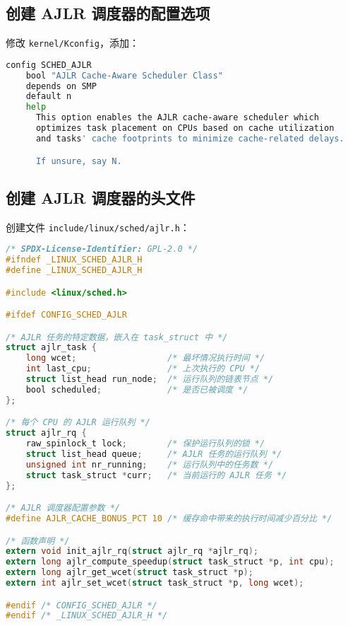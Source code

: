 \documentclass[a4paper,12pt]{article}
\begin{document}
\subsection{创建 AJLR 调度器的配置选项}

修改 \texttt{kernel/Kconfig}，添加：

\begin{lstlisting}[language=bash]
config SCHED_AJLR
    bool "AJLR Cache-Aware Scheduler Class"
    depends on SMP
    default n
    help
      This option enables the AJLR cache-aware scheduler which
      optimizes task placement on CPUs based on cache utilization
      and tasks' cache footprints to minimize cache-related delays.

      If unsure, say N.
\end{lstlisting}

\subsection{创建 AJLR 调度器的头文件}

创建文件 \texttt{include/linux/sched/ajlr.h}：

\begin{lstlisting}[language=C]
/* SPDX-License-Identifier: GPL-2.0 */
#ifndef _LINUX_SCHED_AJLR_H
#define _LINUX_SCHED_AJLR_H

#include <linux/sched.h>

#ifdef CONFIG_SCHED_AJLR

/* AJLR 任务的特定数据，嵌入在 task_struct 中 */
struct ajlr_task {
    long wcet;                  /* 最坏情况执行时间 */
    int last_cpu;               /* 上次执行的 CPU */
    struct list_head run_node;  /* 运行队列的链表节点 */
    bool scheduled;             /* 是否已被调度 */
};

/* 每个 CPU 的 AJLR 运行队列 */
struct ajlr_rq {
    raw_spinlock_t lock;        /* 保护运行队列的锁 */
    struct list_head queue;     /* AJLR 任务的运行队列 */
    unsigned int nr_running;    /* 运行队列中的任务数 */
    struct task_struct *curr;   /* 当前运行的 AJLR 任务 */
};

/* AJLR 调度器配置参数 */
#define AJLR_CACHE_BONUS_PCT 10 /* 缓存命中带来的执行时间减少百分比 */

/* 函数声明 */
extern void init_ajlr_rq(struct ajlr_rq *ajlr_rq);
extern long ajlr_compute_speedup(struct task_struct *p, int cpu);
extern long ajlr_get_wcet(struct task_struct *p);
extern int ajlr_set_wcet(struct task_struct *p, long wcet);

#endif /* CONFIG_SCHED_AJLR */
#endif /* _LINUX_SCHED_AJLR_H */
\end{lstlisting}
\end{document}

